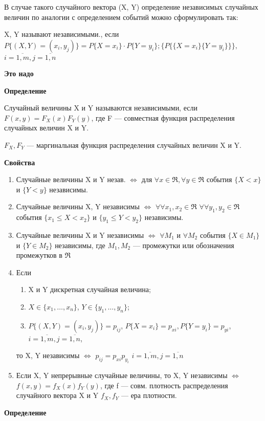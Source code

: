 В случае такого случайного вектора (X, Y) определение независимых случайных величин по аналогии с определением событий можно сформулировать так:

X, Y называют независимыми., если $P\{(X, Y)=(x_i, y_j)\} = P\{X=x_i\} \cdot P\{Y=y_i\}; \{P\{\{X=x_i\}\{Y=y_i\}\}\},$ $i=\overline{1,m}, j=\overline{1,n}$ 

\textbf{Это надо}

\textbf{Определение}

Случайный величины X и Y называются независимыми, если $F(x, y) = F_X(x)F_Y(y)$, где F --- совместная функция распределения случайных величин X и Y.

$F_X, F_Y$ --- маргинальная функция распределения случайных величин X и Y.

\textbf{Свойства}

\begin{enumerate}[label=\arabic*.]
	\item Случайные величины X и Y незав. $\Leftrightarrow$ для $\forall x \in \Re, \forall y \in \Re$ события $\{X<x\}$ и $\{Y < y\}$ независимы.
	\item Случайные величины X, Y независимы $\Leftrightarrow$ $\forall \forall x_1, x_2 \in \Re$ $\forall \forall y_1, y_2 \in \Re$ события $\{x_1 \leq X < x_2\}$ и $\{y_1 \leq Y < y_2\}$ независимы.
	\item Случайные величины X и Y независимы $\Leftrightarrow$ $\forall M_1$ и $\forall M_2$ события $\{X \in M_1\}$ и $\{Y \in M_2\}$ независимы, где $M_1, M_2$ --- промежутки или обозначения промежутков в $\Re$
	\item Если \begin{enumerate}[label=\arabic*]
		\item X и Y дискретная случайная величина;
		\item $X \in \{x_1, \dots, x_n\}$, $Y \in \{y_1, \dots, y_n\}$;
		\item $P\{(X, Y)=(x_i, y_j)\} = p_{ij}$, $P\{X=x_i\}=p_{xi}, P\{Y=y_i\}=p_{yi}$, $i=\overline{1,m}, j=\overline{1,n}$,
	\end{enumerate}
	то X, Y независимы $\Leftrightarrow$ $p_{ij} = p_{xi}p_{y_i}$ $i=\overline{1,m}, j=\overline{1,n}$
	\item Если X, Y непрерывные случайные величины, то X, Y независимы $\Leftrightarrow$ $f(x, y) = f_X(x)f_Y(y)$, где f --- совм. плотность распределения случайного вектора X и Y $f_X, f_Y$ --- ера плотности.
\end{enumerate}

\textbf{Определение}


